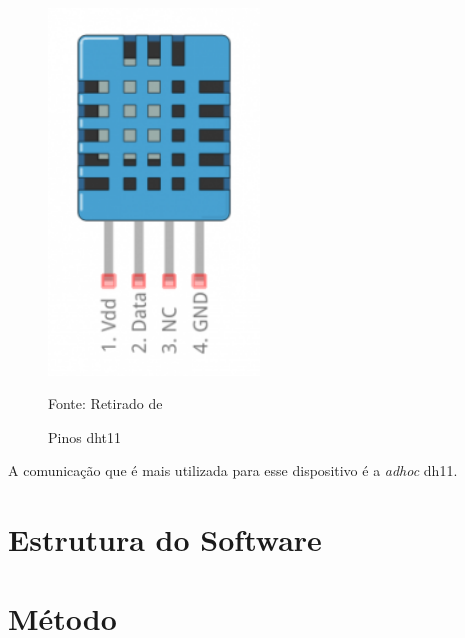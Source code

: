 \documentclass[../../layout.tex]{subfiles}
\begin{document}
\begin{figure}[H]
\centering
\caption{Pinos dht11}
\includegraphics[width=0.5\textwidth]{assets/static/img/dht11_pinout.jpg}
\label{fig:BH1750_pinout}

\begin{minipage}{0.5\textwidth}
\raggedright \footnotesize Fonte: Retirado de \cite{dht11_pinout} 
\end{minipage}
\end{figure}

\hspace*{3em}A comunicação que é mais utilizada para esse dispositivo é a \emph{adhoc} dh11. 

\chapter{Estrutura do Software}
\hspace*{3em}\blindtext[1]
\chapter{Método}
\hspace*{3em}\blindtext[1]
\end{document}
